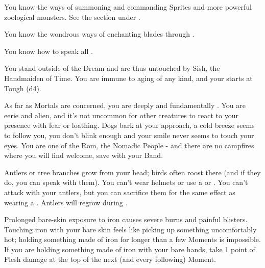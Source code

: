 \begin{multicols*}{2}
    

   You know the ways of summoning and commanding Sprites and more powerful zoological monsters. See the section  under .


  You know the wondrous ways of enchanting blades through . 


  You know how to speak all .



  You stand outside of the Dream and are thus untouched by Sish, the Handmaiden of Time. You are immune to aging of any kind, and your \DEATH starts at Tough (d4).

\newpage



  As far as Mortals are concerned, you are deeply and fundamentally . You are eerie and alien, and it's not uncommon for other creatures to react to your presence with fear or loathing. Dogs bark at your approach, a cold breeze seems to follow you, you don't blink enough and your smile never seems to touch your eyes. You are one of the Rom, the Nomadic People - and there are no campfires where you will find welcome, save with your Band.


  Antlers or tree branches grow from your head; birds often roost there (and if they do, you can speak with them). You can't wear helmets or use a  or . You can't attack with your antlers, but you can sacrifice them for the same effect as wearing a . Antlers will regrow during .

    
    Prolonged bare-skin exposure to iron causes severe burns and painful blisters. Touching iron with your bare skin feels like picking up something uncomfortably hot; holding something made of iron for longer than a few Moments is impossible. If you are holding something made of iron with your bare hands, take 1 point of Flesh damage at the top of the next (and every following) Moment. 


\end{multicols*}
